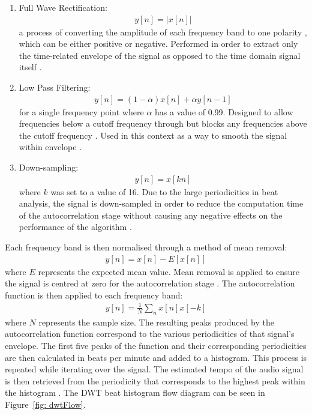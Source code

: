 \documentclass[a4paper, 11pt]{article}
\begin{document}
\begin{enumerate}
\item Full Wave Rectification:
\begin{equation}
\begin{split}
y[n] = |x[n]|
\end{split}
\end{equation}
a process of converting the amplitude of each frequency band to one polarity \cite{pallas}, which can be either positive or negative. Performed in order to extract only the time-related envelope of the signal as opposed to the time domain signal itself \cite{tzane3}. 
\item Low Pass Filtering:
\begin{equation}
\begin{split}
y[n] = (1 - \alpha)x[n] + \alpha y[n - 1] 
\end{split}
\end{equation}
for a single frequency point where $\alpha$ has a value of 0.99. Designed to allow frequencies below a cutoff frequency through but blocks any frequencies above the cutoff frequency \cite{smith}. Used in this context as a way to smooth the signal within envelope \cite{tzane3}.
\item Down-sampling:
\begin{equation}
\begin{split}
y[n] = x[kn]
\end{split}
\end{equation}
where $k$ was set to a value of 16. Due to the large periodicities in beat analysis, the signal is down-sampled in order to reduce the computation time of the autocorrelation stage without causing any negative effects on the performance of the algorithm \cite{tzane3}.
\end{enumerate}

Each frequency band is then normalised through a method of mean removal:
\begin{equation}
\begin{split}
y[n] = x[n] - E[x[n]]
\end{split}
\end{equation}
where $E$ represents the expected mean value. Mean removal is applied to ensure the signal is centred at zero for the autocorrelation stage \cite{tzane3}. The autocorrelation function is then applied to each frequency band:
\begin{equation}
\begin{split}
y[n] = \frac{1}{N}\sum_{n} x[n]x[-k]
\end{split}
\end{equation}
where $N$ represents the sample size. The resulting peaks produced by the autocorrelation function correspond to the various periodicities of that signal's envelope. The first five peaks of the function and their corresponding periodicities are then calculated in beats per minute and added to a histogram. This process is repeated while iterating over the signal. The estimated tempo of the audio signal is then retrieved from the periodicity that corresponds to the highest peak within the histogram \cite{tzane1}. The DWT beat histogram flow diagram can be seen in Figure~\ref{fig: dwtFlow}.
\end{document}
